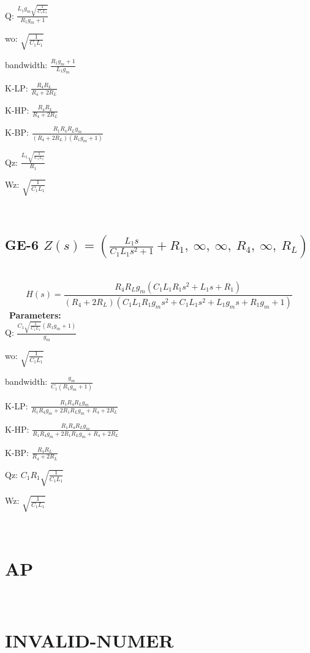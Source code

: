 \documentclass{article}
\begin{document}
Q: $\frac{L_{1} g_{m} \sqrt{\frac{1}{C_{1} L_{1}}}}{R_{1} g_{m} + 1}$\ 

wo: $\sqrt{\frac{1}{C_{1} L_{1}}}$\ 

bandwidth: $\frac{R_{1} g_{m} + 1}{L_{1} g_{m}}$\ 

K-LP: $\frac{R_{4} R_{L}}{R_{4} + 2 R_{L}}$\ 

K-HP: $\frac{R_{4} R_{L}}{R_{4} + 2 R_{L}}$\ 

K-BP: $\frac{R_{1} R_{4} R_{L} g_{m}}{\left(R_{4} + 2 R_{L}\right) \left(R_{1} g_{m} + 1\right)}$\ 

Qz: $\frac{L_{1} \sqrt{\frac{1}{C_{1} L_{1}}}}{R_{1}}$\ 

Wz: $\sqrt{\frac{1}{C_{1} L_{1}}}$\ 

\ 

\subsection{GE-6 $Z(s) = \left( \frac{L_{1} s}{C_{1} L_{1} s^{2} + 1} + R_{1}, \  \infty, \  \infty, \  R_{4}, \  \infty, \  R_{L}\right)$ } \ 
\textbf{\[H(s) = \frac{R_{4} R_{L} g_{m} \left(C_{1} L_{1} R_{1} s^{2} + L_{1} s + R_{1}\right)}{\left(R_{4} + 2 R_{L}\right) \left(C_{1} L_{1} R_{1} g_{m} s^{2} + C_{1} L_{1} s^{2} + L_{1} g_{m} s + R_{1} g_{m} + 1\right)}\] } \ 
\textbf{Parameters:}\\ 

Q: $\frac{C_{1} \sqrt{\frac{1}{C_{1} L_{1}}} \left(R_{1} g_{m} + 1\right)}{g_{m}}$\ 

wo: $\sqrt{\frac{1}{C_{1} L_{1}}}$\ 

bandwidth: $\frac{g_{m}}{C_{1} \left(R_{1} g_{m} + 1\right)}$\ 

K-LP: $\frac{R_{1} R_{4} R_{L} g_{m}}{R_{1} R_{4} g_{m} + 2 R_{1} R_{L} g_{m} + R_{4} + 2 R_{L}}$\ 

K-HP: $\frac{R_{1} R_{4} R_{L} g_{m}}{R_{1} R_{4} g_{m} + 2 R_{1} R_{L} g_{m} + R_{4} + 2 R_{L}}$\ 

K-BP: $\frac{R_{4} R_{L}}{R_{4} + 2 R_{L}}$\ 

Qz: $C_{1} R_{1} \sqrt{\frac{1}{C_{1} L_{1}}}$\ 

Wz: $\sqrt{\frac{1}{C_{1} L_{1}}}$\ 

\ 

\section{AP}\ 
\section{INVALID-NUMER}\ 
\end{document}

